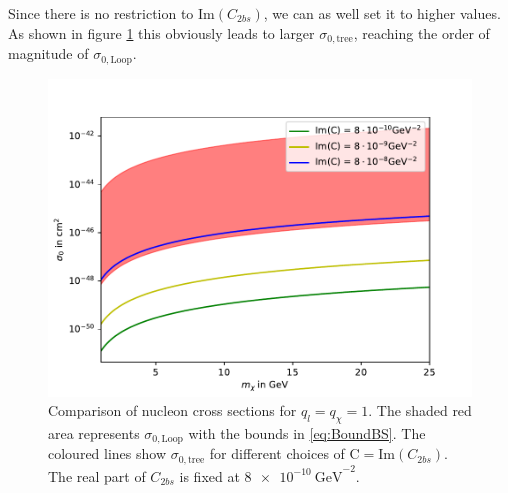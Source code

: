 Since there is no restriction to $\text{Im}(C_{2bs})$, we can as well set it to higher values. As shown in figure \ref{fig:HighIm11} this obviously leads to larger $\sigma_{0,\text{tree}}$, reaching the order of magnitude of $\sigma_{0,\text{Loop}}$.
\begin{figure}
	\centering
	\includegraphics[scale=.8]{content/graphics/Im11.pdf}
	\caption{Comparison of nucleon cross sections for $q_l=q_\chi=1$. The shaded red area represents $\sigma_{0,\text{Loop}}$ with the bounds in \eqref{eq:BoundBS}. The coloured lines show $\sigma_{0,\text{tree}}$ for different choices of $\text{C} = \text{Im}(C_{2bs})$. The real part of $C_{2bs}$ is fixed at $\SI{8e-10}{\giga\electronvolt}^{-2}$.}
	\label{fig:HighIm11}
\end{figure}




